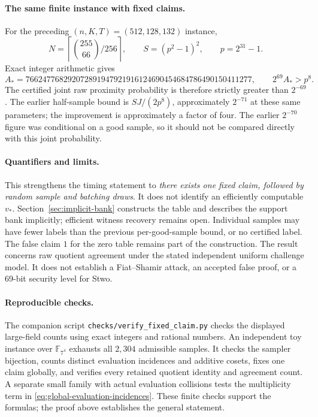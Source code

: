 \documentclass[11pt,letterpaper]{article}
\theoremstyle{definition}
\theoremstyle{remark}
\begin{document}
\paragraph{The same finite instance with fixed claims.}
For the preceding $(n,K,T)=(512,128,132)$ instance,
\[
 N=\left\lceil\binom{255}{66}/256\right\rceil,
 \qquad S=(p^2-1)^2,\qquad p=2^{31}-1.
\]
Exact integer arithmetic gives
\[
 A_*=
 766247768292072891947921916124690454684786490150411277,
 \qquad 2^{69}A_*>p^8.
\]
The certified joint raw proximity probability is therefore strictly
greater than $2^{-69}$. The earlier half-sample bound is
$SJ/(2p^8)$, approximately $2^{-71}$ at these same parameters;
the improvement is approximately a factor of four. The earlier
$2^{-70}$ figure was conditional on a good sample, so it should
not be compared directly with this joint probability.

\paragraph{Quantifiers and limits.}
This strengthens the timing statement to
\emph{there exists one fixed claim, followed by random sample and
batching draws}. It does not identify an efficiently computable $v_*$.
Section~\ref{sec:implicit-bank} constructs the table and describes the
support bank implicitly; efficient witness recovery remains open. Individual samples may have fewer labels
than the previous per-good-sample bound, or no certified label.
The false claim $1$ for the zero table remains part of the construction.
The result concerns raw quotient agreement under the stated independent
uniform challenge model. It does not establish a Fiat--Shamir attack,
an accepted false proof, or a 69-bit security level for Stwo.

\paragraph{Reproducible checks.}
The companion script \texttt{checks/verify\_fixed\_claim.py} checks the
displayed large-field counts using exact integers and rational numbers.
An independent toy instance over $\mathbb F_{7^4}$ exhausts all
$2{,}304$ admissible samples. It checks the sampler bijection, counts
distinct evaluation incidences and additive cosets, fixes one claim
globally, and verifies every retained quotient identity and agreement
count. A separate small family with actual evaluation collisions tests
the multiplicity term in \eqref{eq:global-evaluation-incidences}.
These finite checks support the formulas; the proof above establishes
the general statement.
\end{document}
